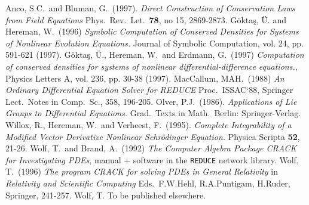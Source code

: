 \begin{thebibliography}{99}
 Anco, S.C.\ and Bluman, G.\ (1997).
        {\it Direct Construction of Conservation Laws from Field Equations}
        Phys.\ Rev.\ Let.\ {\bf 78}, no 15, 2869-2873.
 G\"{o}kta\c{s}, \"{U}. and Hereman, W.\ (1996) {\it Symbolic
        Computation of Conserved Densities for Systems of Nonlinear
        Evolution Equations.} Journal of Symbolic Computation,
        {vol. 24}, pp. 591-621 (1997).
 G\"{o}kta\c{s}, \"{U}., Hereman, W.\ and Erdmann, G.\ (1997)
        {\it Computation of conserved densities for systems of nonlinear
        differential-difference equations.},
        Physics Letters A, {vol. 236}, pp. 30-38 (1997).
 MacCallum, MAH.\ (1988) {\it An Ordinary Differential Equation
        Solver for REDUCE} Proc.\ ISSAC`88, Springer Lect.\ Notes in
        Comp.\ Sc., 358, 196-205.
 Olver, P.J.\ (1986). {\it Applications of Lie Groups to
        Differential Equations.} Grad.\ Texts in Math.\ Berlin:
        Springer-Verlag.
 Willox, R., Hereman, W.\ and Verheest, F.\ (1995).
        {\it Complete Integrability of a Modified Vector Derivative
        Nonlinear Schr\"{o}dinger Equation.} Physica Scripta {\bf 52}, 21-26.
 Wolf, T.\ and Brand, A.\ (1992)
        {\it The Computer Algebra Package CRACK for Investigating
        PDEs}, manual + software in the {\tt REDUCE} network library.
 Wolf, T.\ (1996) {\it The program CRACK for solving PDEs
        in General Relativity} in {\it Relativity and Scientific Computing}
        Eds.\ F.W.Hehl, R.A.Puntigam, H.Ruder, Springer, 241-257.
 Wolf, T. To be published elsewhere.

\end{thebibliography}

 